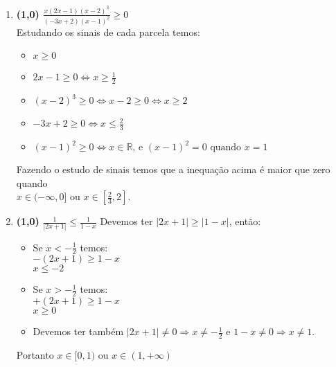 \documentclass[a4paper,12pt]{article}
\newcommand{\RR}{\mathbb{R}}
\newcommand{\ds}{\displaystyle}
\begin{document}
\begin{enumerate}
\begin{enumerate}
 \item {\bf (1,0)} $\ds \frac{x(2x-1)(x-2)^3}{(-3x+2)(x-1)^2}\geq 0  $\\
 \vspace{3mm}
 Estudando os sinais de cada parcela temos:
  \begin{itemize}
   \item $x\geq0$\\
   \item $2x-1\geq0 \Leftrightarrow x\geq\frac{1}{2}$\\
   \item $(x-2)^3\geq0 \Leftrightarrow x-2\geq0 \Leftrightarrow x\geq2$\\
   \item $-3x+2\geq0 \Leftrightarrow x\leq\frac{2}{3}$\\
   \item $(x-1)^2\geq0 \Leftrightarrow x\in \RR \mbox{, e } (x-1)^2 = 0 \mbox{ quando } x = 1$\\
  \end{itemize}
 Fazendo o estudo de sinais temos que a inequação acima é maior que zero quando\\ $x\in(-\infty,0]$ ou $x\in[\frac{2}{3},2]$.\\

\item {\bf (1,0)} $\ds \frac{1}{|2x+1|}\leq  \frac{1}{1-x}  $
Devemos ter $|2x+1|\geq|1-x|$, então:
  \begin{itemize}
  \item Se $x<-\frac{1}{2}$ temos:\\
  $-(2x+1)\geq1-x$\\
  $x\leq-2$\\
  \item Se $x>-\frac{1}{2}$ temos:\\
  $+(2x+1)\geq1-x$\\
  $x\geq0$\\
  \item Devemos ter também $|2x+1|\neq0 \Rightarrow x\neq-\frac{1}{2}$ e $1-x\neq0 \Rightarrow x\neq 1$.
  \end{itemize}
  Portanto $x\in[0,1)$ ou $x\in(1,+\infty)$\\


\end{enumerate}
\end{enumerate}
\end{document}

